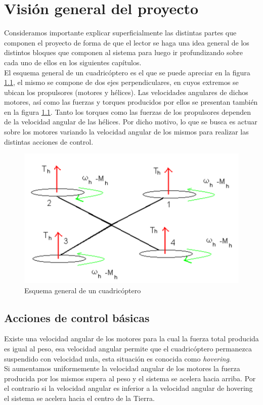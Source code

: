 \documentclass[main]{subfiles}
\begin{document}
\chapter{Visi\'on general del proyecto}
Consideramos importante explicar superficialmente las distintas partes que componen el proyecto de forma de que el lector se haga una idea general de los distintos bloques que componen al sistema para luego ir profundizando sobre cada uno de ellos en los siguientes cap\'itulos.\\

El esquema general de un cuadric\'optero es el que se puede apreciar en la figura \ref{fig:cuad}, el mismo se compone de dos ejes perpendiculares, en cuyos extremos se ubican los propulsores (motores y h\'elices). Las velocidades angulares de dichos motores, as\'i como las fuerzas y torques producidos por ellos se presentan tambi\'en en la figura \ref{fig:cuad}. Tanto los torques como las fuerzas de los propulsores dependen de la velocidad angular de las h\'elices. Por dicho motivo, lo que se busca es actuar sobre los motores variando la velocidad angular de los mismos para realizar las distintas acciones de control.

\begin{figure}
\centering
\includegraphics[scale=0.5]{./pics_general/quad_hov.pdf}
\caption{Esquema general de un cuadric\'optero}
\label{fig:cuad}
\end{figure}
\section{Acciones de control b\'asicas}
Existe una velocidad angular de los motores para la cual la fuerza total producida es igual al peso, esa velocidad angular permite que el cuadric\'optero permanezca suspendido con velocidad nula, esta situaci\'on es conocida como \emph{hovering}.\\ Si aumentamos uniformemente la velocidad angular de los motores la fuerza producida por los mismos supera al peso y el sistema se acelera hacia arriba. Por el contrario si la velocidad angular es inferior a la velocidad angular de hovering el sistema se acelera hacia el centro de la Tierra.\\
\end{document}
